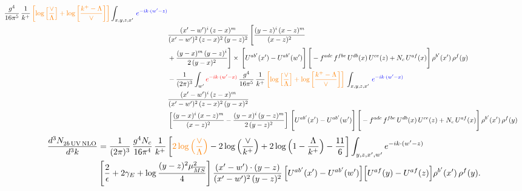 \documentclass[9pt]{article}
\numberwithin{equation}{section}
\begin{document}
\begin{align}
\frac{g^{4}}{16\pi^{5}}\,\frac{1}{k^{+}}\,{\color{orange}\left[\log{\left[\frac{\vee}{\Lambda}\right]}+\log{\left[\frac{k^{+}-\Lambda}{\vee}\right]}\right]} \int_{x,y,z,x'}\, {\color{blue}e^{-ik\cdot(w'-z)}}\notag \\ & \frac{(x'-w')^{i}\,(z-x)^{m}}{(x'-w')^{2}\,(z-x)^{2}\, (y-z)^{2}}\,\Bigg[\frac{(y-z)^{i}\,(x-z)^{m}}{(x-z)^{2}}\notag \\ & +\frac{(y-x)^{m}\,(y-z)^{i}}{2\,(y-x)^{2}}\Bigg]\times\, \Bigg[U^{ab'}(x')-U^{ab'}(w')\Bigg]\,\Bigg[-f^{adc}\,f^{fbe}\,U^{db}(x)\,U^{ce}(z)+N_{c}\,U^{af}(x)\Bigg]\,\rho^{b'}(x')\,\rho^{f}(y)\notag \\ & - \frac{1}{(2\pi)^{3}}  \int_{w^\prime} {\color{red}e^{-ik\cdot(w'-x)}}\, \frac{g^{4}}{16\pi^{5}}\,\frac{1}{k^{+}}\,{\color{orange}\left[\log{\left[\frac{\vee}{\Lambda}\right]}+\log{\left[\frac{k^{+}-\Lambda}{\vee}\right]}\right]}\, \int_{x,y,z,x'}\,{\color{blue}e^{-ik\cdot(w'-x)}}\notag \\ & \frac{(x'-w')^{i}\,(z-x)^{m}}{(x'-w')^{2}\,(z-x)^{2}\,(y-x)^{2}} \notag \\ &\left[\frac{(y-x)^{i}\,(x-z)^{m}}{(x-z)^{2}}-\frac{(y-x)^{i}\,(y-z)^{m}}{2\,(y-z)^{2}}\right]\, \Bigg[U^{ab'}(x')-U^{ab'}(w')\Bigg]\,\Bigg[-f^{adc}\,f^{fbe}\,U^{db}(x)\,U^{ce}(z)+N_{c}\,U^{af}(x)\Bigg]\,\rho^{b'}(x')\,\rho^{f}(y)
\end{align}
\begin{align}
\frac{d^{3}N_{2b\,\rm UV\, NLO}^{\rm}}{d^{3}k} & = \frac{1}{(2\pi)^{3}}\,\frac{g^{4}N_{c}}{16\pi^{4}}\,\frac{1}{k^{+}}
\left[{\color{orange}2\log\Big(\frac{\vee}{\Lambda}\Big)}-2\log\Big(\frac{\vee}{k^{+}}\Big)+2\log\Big(1-\frac{\Lambda}{k^{+}}\Big)-\frac{11}{6}\right]\int_{y,z,x',w'}e^{-ik\cdot(w'-z)}\notag \\ & \left[\frac{2}{\epsilon}+2\gamma_{E}+\log\frac{(y-z)^{2}\mu^{2}_{\overline{MS}}}{4}\right]
\frac{(x'-w')\cdot(y-z)}{(x'-w')^{2}\,(y-z)^{2}}\, \Big[U^{ab'}(x')-U^{ab'}(w')\Big]\Big[U^{af}(y)-U^{af}(z)\Big]\rho^{b'}(x')\,\rho^{f}(y).
\end{align}
\end{document}
